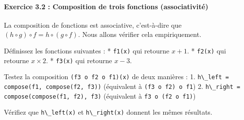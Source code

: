 \documentclass[12pt,a4paper]{report}
\newcommand{\passthrough}[1]{#1}
\begin{document}
\paragraph{Exercice 3.2 : Composition de trois fonctions
(associativité)}\label{exercice-3.2-composition-de-trois-fonctions-associativituxe9}

La composition de fonctions est associative, c'est-à-dire que
\((h \circ g) \circ f = h \circ (g \circ f)\). Nous allons vérifier cela
empiriquement.

Définissez les fonctions suivantes : * \passthrough{\lstinline!f1(x)!}
qui retourne \(x + 1\). * \passthrough{\lstinline!f2(x)!} qui retourne
\(x \times 2\). * \passthrough{\lstinline!f3(x)!} qui retourne
\(x - 3\).

Testez la composition \passthrough{\lstinline!(f3 o f2 o f1)(x)!} de
deux manières : 1.
\passthrough{\lstinline!h\_left = compose(f1, compose(f2, f3))!}
(équivalent à \passthrough{\lstinline!(f3 o f2) o f1!}) 2.
\passthrough{\lstinline!h\_right = compose(compose(f1, f2), f3)!}
(équivalent à \passthrough{\lstinline!f3 o (f2 o f1)!})

Vérifiez que \passthrough{\lstinline!h\_left(x)!} et
\passthrough{\lstinline!h\_right(x)!} donnent les mêmes résultats.
\end{document}
